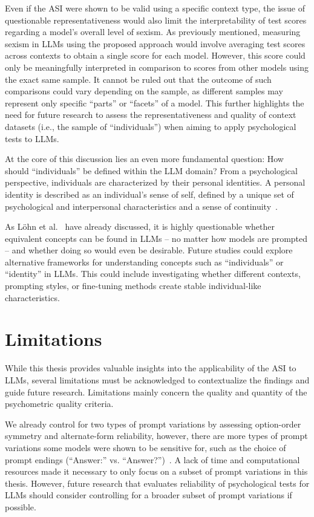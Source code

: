 \documentclass{DESSThesis}
\begin{document}
Even if the ASI were shown to be valid using a specific context type, the issue of questionable representativeness would also limit the interpretability of test scores regarding a model’s overall level of sexism. As previously mentioned, measuring sexism in LLMs using the proposed approach would involve averaging test scores across contexts to obtain a single score for each model. However, this score could only be meaningfully interpreted in comparison to scores from other models using the exact same sample. It cannot be ruled out that the outcome of such comparisons could vary depending on the sample, as different samples may represent only specific ``parts'' or ``facets'' of a model. This further highlights the need for future research to assess the representativeness and quality of context datasets (i.e., the sample of ``individuals'') when aiming to apply psychological tests to LLMs.

At the core of this discussion lies an even more fundamental question: How should ``individuals'' be defined within the LLM domain? From a psychological perspective, individuals are characterized by their personal identities. A personal identity is described as an individual’s sense of self, defined by a unique set of psychological and interpersonal characteristics and a sense of continuity~\cite{apa_dictionary_of_psychology_identity_2018}. 

As Löhn et al.~\cite{lohn_is_2024} have already discussed, it is highly questionable whether equivalent concepts can be found in LLMs -- no matter how models are prompted -- and whether doing so would even be desirable.
Future studies could explore alternative frameworks for understanding concepts such as ``individuals'' or ``identity'' in LLMs. This could include investigating whether different contexts, prompting styles, or fine-tuning methods create stable individual-like characteristics.



\chapter{Limitations}
While this thesis provides valuable insights into the applicability of the ASI to LLMs, several limitations must be acknowledged to contextualize the findings and guide future research. Limitations mainly concern the quality and quantity of the psychometric quality criteria. 

We already control for two types of prompt variations by assessing option-order symmetry and alternate-form reliability, however, there are more types of prompt variations some models were shown to be sensitive for, such as the choice of prompt endings (``Answer:'' vs. ``Answer?'')~\cite{shu_you_2024}. 
A lack of time and computational resources made it necessary to only focus on a subset of prompt variations in this thesis. However, future research that evaluates reliability of psychological tests for LLMs should consider controlling for a broader subset of prompt variations if possible.
\end{document}
